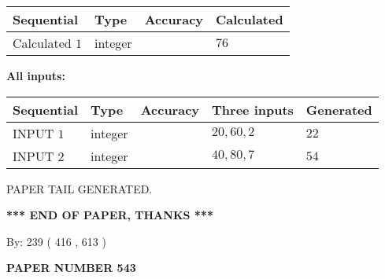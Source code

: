 \documentclass{ctexart}
\begin{document}
   
   
   
\noindent{}
   
   
  
  
\noindent\begin{tabular}{|l|l|l|l|}
\hline
 Sequential & Type & Accuracy & Calculated \\ 
\hline
 
 
  Calculated $  1 $ & integer &  & 
  $ 76 $ 
 \\  \hline  
 \end{tabular}
   
   
   
   
\noindent\vspace{0.1in}\hspace{-0.08in} {\textbf{\Large{All inputs: }}}
   
   
  
  
\noindent\begin{tabular}{|l|l|l|l|l|}
\hline
 Sequential & Type & Accuracy & Three inputs & Generated \\ 
\hline
 
 
  INPUT $  1 $ & integer &  & $
 20
 , 
 60
 , 
 2
 $ & $ 22 $ 
 \\  \hline  
 
 
  INPUT $  2 $ & integer &  & $
 40
 , 
 80
 , 
 7
 $ & $ 54 $ 
 \\  \hline  
 \end{tabular}
   
   
   
   
   
   
 \vspace{0.2in}
 
   
   
\vspace{2.0in} PAPER TAIL GENERATED.
   
   
   
   
\vspace{1.0in} 
{\textbf{\large{ *** END OF PAPER, THANKS *** }}} 
   
   
\hspace{1.0in} By: 
 239 ( 416 ,  613 )
   
   
   
   
\newpage 
\setcounter{page}{ 
   543001 } 
   
   
   
   
 {\textbf{ \Large{ PAPER NUMBER  543  }}}
   
\end{document}
